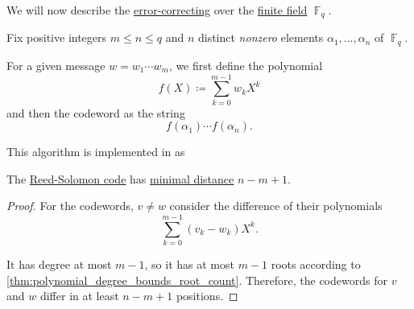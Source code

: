 \begin{algorithm}\label{alg:reed_solomon_code}
  We will now describe the \hyperref[def:error_correcting_code]{error-correcting}  over the \hyperref[def:finite_field]{finite field} \( \BbbF_q \).

  Fix positive integers \( m \leq n \leq q \) and \( n \) distinct \emph{nonzero} elements \( \alpha_1, \ldots, \alpha_n \) of \( \BbbF_q \).

  For a given message \( w = w_1 \cdots w_m \), we first define the polynomial
  \begin{equation*}
    f(X) \coloneqq \sum_{k=0}^{m-1} w_k X^k
  \end{equation*}
  and then the codeword as the string
  \begin{equation*}
    f(\alpha_1) \cdots f(\alpha_n).
  \end{equation*}
\end{algorithm}
\begin{comments}
  \item This algorithm is implemented in \cite{notebook:code} as
  \begin{CodeRefDisplay}
  \end{CodeRefDisplay}
\end{comments}

\begin{proposition}\label{thm:reed_solomon_distance}
  The \hyperref[alg:reed_solomon_code]{Reed-Solomon code} has \hyperref[def:error_correcting_code/distance]{minimal distance} \( n - m + 1 \).
\end{proposition}
\begin{proof}
  For the codewords, \( v \neq w \) consider the difference of their polynomials
  \begin{equation*}
    \sum_{k=0}^{m-1} (v_k - w_k) X^k.
  \end{equation*}

  It has degree at most \( m - 1 \), so it has at most \( m - 1 \) roots according to \cref{thm:polynomial_degree_bounds_root_count}. Therefore, the codewords for \( v \) and \( w \) differ in at least \( n - m + 1 \) positions.
\end{proof}

